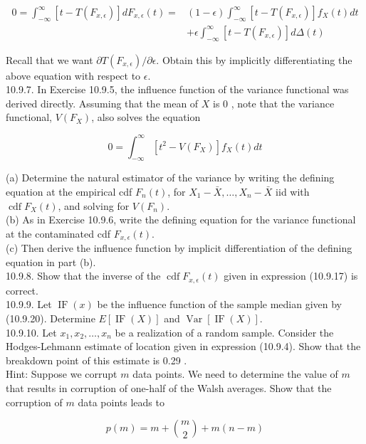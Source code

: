 \begin{align*}
0=\int_{-\infty}^{\infty}\left[t-T\left(F_{x, \epsilon}\right)\right] d F_{x, \epsilon}(t)= & (1-\epsilon) \int_{-\infty}^{\infty}\left[t-T\left(F_{x, \epsilon}\right)\right] f_{X}(t) d t \\
& +\epsilon \int_{-\infty}^{\infty}\left[t-T\left(F_{x, \epsilon}\right)\right] d \Delta(t) \tag{10.9.52}
\end{align*}


Recall that we want $\partial T\left(F_{x, \epsilon}\right) / \partial \epsilon$. Obtain this by implicitly differentiating the above equation with respect to $\epsilon$.\\
10.9.7. In Exercise 10.9.5, the influence function of the variance functional was derived directly. Assuming that the mean of $X$ is 0 , note that the variance functional, $V\left(F_{X}\right)$, also solves the equation

$$
0=\int_{-\infty}^{\infty}\left[t^{2}-V\left(F_{X}\right)\right] f_{X}(t) d t
$$

(a) Determine the natural estimator of the variance by writing the defining equation at the empirical cdf $F_{n}(t)$, for $X_{1}-\bar{X}, \ldots, X_{n}-\bar{X}$ iid with $\operatorname{cdf} F_{X}(t)$, and solving for $V\left(F_{n}\right)$.\\
(b) As in Exercise 10.9.6, write the defining equation for the variance functional at the contaminated cdf $F_{x, \epsilon}(t)$.\\
(c) Then derive the influence function by implicit differentiation of the defining equation in part (b).\\
10.9.8. Show that the inverse of the $\operatorname{cdf} F_{x, \epsilon}(t)$ given in expression (10.9.17) is correct.\\
10.9.9. Let $\operatorname{IF}(x)$ be the influence function of the sample median given by (10.9.20). Determine $E[\operatorname{IF}(X)]$ and $\operatorname{Var}[\operatorname{IF}(X)]$.\\
10.9.10. Let $x_{1}, x_{2}, \ldots, x_{n}$ be a realization of a random sample. Consider the Hodges-Lehmann estimate of location given in expression (10.9.4). Show that the breakdown point of this estimate is 0.29 .\\
Hint: Suppose we corrupt $m$ data points. We need to determine the value of $m$ that results in corruption of one-half of the Walsh averages. Show that the corruption of $m$ data points leads to

$$
p(m)=m+\binom{m}{2}+m(n-m)
$$

